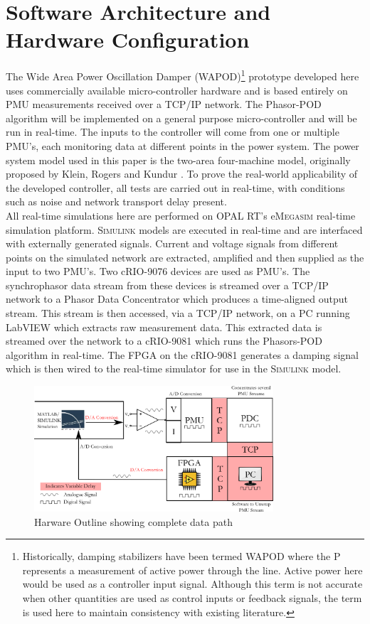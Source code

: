 \documentclass[journal]{IEEEtran}
\begin{document}
\section{Software Architecture and Hardware Configuration}

The Wide Area Power Oscillation Damper (WAPOD)\footnote{Historically, damping stabilizers have been termed WAPOD where the P represents a measurement of active power through the line. Active power here would be used as a controller input signal. Although this term is not accurate when other quantities are used as control inputs or feedback signals, the term is used here to maintain consistency with existing literature.} prototype developed here uses commercially available micro-controller hardware and is based entirely on PMU measurements received over a TCP/IP network. The Phasor-POD algorithm \cite{PhasorPOD} will be implemented on a general purpose micro-controller and will be run in real-time. The inputs to the controller will come from one or multiple PMU's, each monitoring data at different points in the power system. The power system model used in this paper is the two-area four-machine model, originally proposed by Klein, Rogers and Kundur \cite{KundurTwoArea}. To prove the real-world applicability of the developed controller, all tests are carried out in real-time, with conditions such as noise and network transport delay present.\\

All real-time simulations here are performed on OPAL RT's e\textsc{Megasim} \cite{OPALemegasim} real-time simulation platform. \textsc{Simulink} models are executed in real-time and are interfaced with externally generated signals. Current and voltage signals from different points on the simulated network are extracted, amplified and then supplied as the input to two PMU's. Two cRIO-9076 \cite{cRIO9076} devices are used as PMU's. The synchrophasor data stream from these devices is streamed over a TCP/IP network to a Phasor Data Concentrator which produces a time-aligned output stream. This stream is then accessed, via a TCP/IP network, on a PC running LabVIEW which extracts raw measurement data. This extracted data is streamed over the network to a cRIO-9081 which runs the Phasors-POD algorithm in real-time. The FPGA on the cRIO-9081 \cite{cRIO9081} generates a damping signal which is then wired to the real-time simulator for use in the \textsc{Simulink} model.\\

\begin{figure}[!h]
\centering
\includegraphics[width=3.5in]{DataFlow.png} 
\caption{Harware Outline showing complete data path}
\label{Hardware_Outline}
\end{figure}
\end{document}
